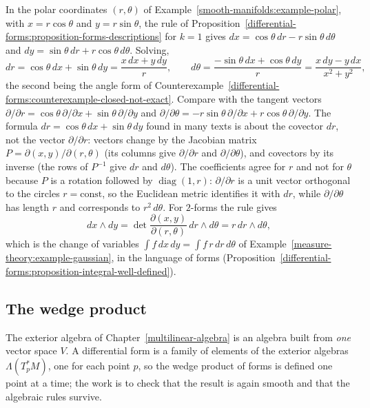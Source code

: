 \begin{example}\label{differential-forms:example-polar-forms}
In the polar coordinates $(r, \theta)$ of Example~\ref{smooth-manifolds:example-polar}, with $x = r\cos\theta$ and $y = r\sin\theta$, the rule of
Proposition~\ref{differential-forms:proposition-forms-descriptions} for $k = 1$ gives $dx = \cos\theta\,dr - r\sin\theta\,d\theta$ and $dy = \sin\theta\,dr + r\cos\theta\,d\theta$.
Solving,
\[
dr = \cos\theta\,dx + \sin\theta\,dy = \frac{x\,dx + y\,dy}{r}, \qquad d\theta = \frac{-\sin\theta\,dx + \cos\theta\,dy}{r} = \frac{x\,dy - y\,dx}{x^2 + y^2},
\]
the second being the angle form of Counterexample~\ref{differential-forms:counterexample-closed-not-exact}. Compare with the tangent vectors
$\partial/\partial r = \cos\theta\,\partial/\partial x + \sin\theta\,\partial/\partial y$ and $\partial/\partial\theta = -r\sin\theta\,\partial/\partial x + r\cos\theta\,\partial/\partial y$.
The formula $dr = \cos\theta\,dx + \sin\theta\,dy$ found in many texts is about the covector $dr$, not the vector $\partial/\partial r$: vectors change by the Jacobian matrix
$P = \partial(x, y)/\partial(r, \theta)$ (its columns give $\partial/\partial r$ and $\partial/\partial\theta$), and covectors by its inverse (the rows of $P^{-1}$ give $dr$ and $d\theta$).
The coefficients agree for $r$ and not for $\theta$ because $P$ is a rotation followed by $\operatorname{diag}(1, r)$: $\partial/\partial r$ is a unit vector orthogonal to the
circles $r = \text{const}$, so the Euclidean metric identifies it with $dr$, while $\partial/\partial\theta$ has length $r$ and corresponds to $r^2\,d\theta$. For $2$-forms the rule
gives
\[
dx \wedge dy = \det\frac{\partial(x, y)}{\partial(r, \theta)}\,dr \wedge d\theta = r\,dr \wedge d\theta,
\]
which is the change of variables $\int f\,dx\,dy = \int f\,r\,dr\,d\theta$ of Example~\ref{measure-theory:example-gaussian}, in the language of forms
(Proposition~\ref{differential-forms:proposition-integral-well-defined}).
\end{example}

\subsection{The wedge product}\label{differential-forms:subsection-wedge}

The exterior algebra of Chapter~\ref{multilinear-algebra} is an algebra built from \emph{one} vector space $V$. A differential form is a family of elements of the exterior algebras $\Lambda(T_p^*M)$, one for each point $p$,
so the wedge product of forms is defined one point at a time; the work is to check that the result is again smooth and that the algebraic rules survive.

